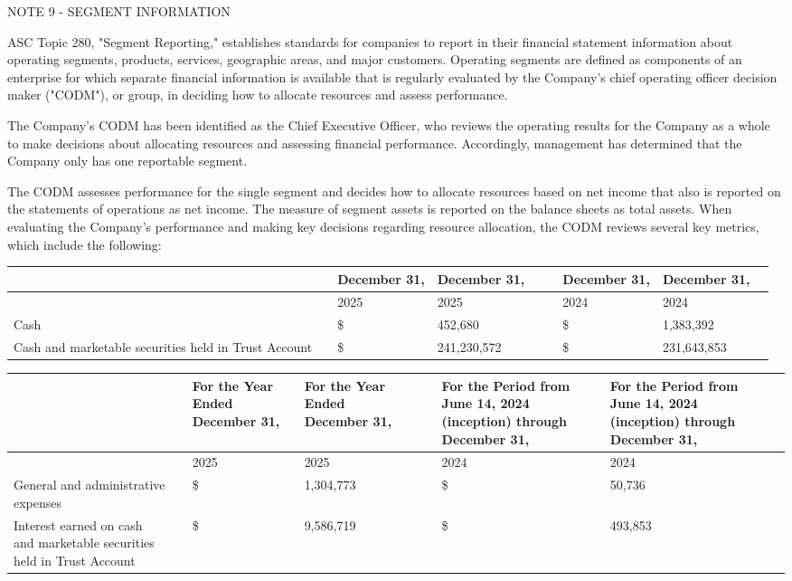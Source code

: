 \documentclass[11pt,a4paper]{article}
\begin{document}
NOTE 9 - SEGMENT INFORMATION

ASC Topic 280, "Segment Reporting," establishes standards for companies to report in their financial statement information about operating segments, products, services, geographic areas, and major customers. Operating segments are defined as components of an enterprise for which separate financial information is available that is regularly evaluated by the Company's chief operating officer decision maker ("CODM"), or group, in deciding how to allocate resources and assess performance.

The Company's CODM has been identified as the Chief Executive Officer, who reviews the operating results for the Company as a whole to make decisions about allocating resources and assessing financial performance. Accordingly, management has determined that the Company only has one reportable segment.

The CODM assesses performance for the single segment and decides how to allocate resources based on net income that also is reported on the statements of operations as net income. The measure of segment assets is reported on the balance sheets as total assets. When evaluating the Company's performance and making key decisions regarding resource allocation, the CODM reviews several key metrics, which include the following:

\begin{table}[h]
\begin{tabular}{|l|l|l|l|l|l|l|l|l|}
\hline
 &  & December 31, & December 31, &  &  & December 31, & December 31, &  \\ \hline
 &  & 2025 & 2025 &  &  & 2024 & 2024 &  \\ \hline
Cash &  & \$ & 452,680 &  &  & \$ & 1,383,392 &  \\ \hline
Cash and marketable securities held in Trust Account &  & \$ & 241,230,572 &  &  & \$ & 231,643,853 &  \\ \hline
\end{tabular}
\end{table}

\begin{table}[h]
\begin{tabular}{|l|l|l|l|l|l|l|l|l|}
\hline
 &  & For the Year Ended December 31, & For the Year Ended December 31, &  &  & For the Period from June 14, 2024 (inception) through December 31, & For the Period from June 14, 2024 (inception) through December 31, &  \\ \hline
 &  & 2025 & 2025 &  &  & 2024 & 2024 &  \\ \hline
General and administrative expenses &  & \$ & 1,304,773 &  &  & \$ & 50,736 &  \\ \hline
Interest earned on cash and marketable securities held in Trust Account &  & \$ & 9,586,719 &  &  & \$ & 493,853 &  \\ \hline
\end{tabular}
\end{table}
\end{document}
